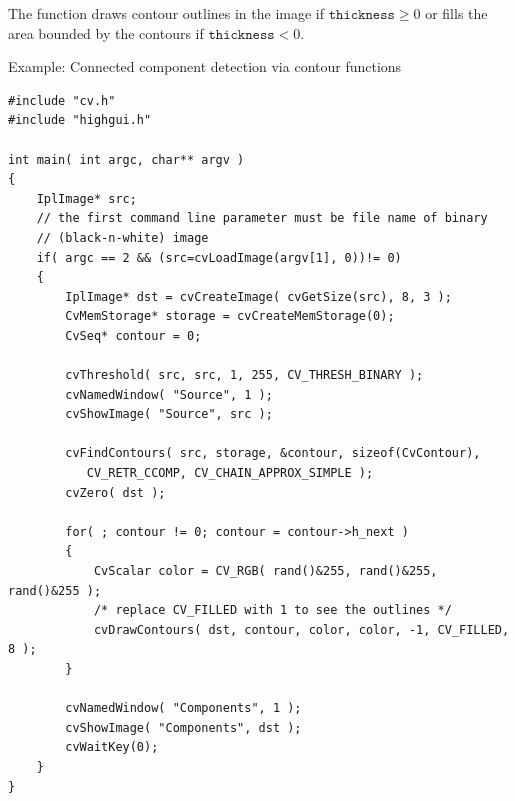 \begin{description}
\end{description}

The function draws contour outlines in the image if $\texttt{thickness} \ge 0$ or fills the area bounded by the contours if $ \texttt{thickness}<0$.

\ifC
Example: Connected component detection via contour functions

\begin{lstlisting}
#include "cv.h"
#include "highgui.h"

int main( int argc, char** argv )
{
    IplImage* src;
    // the first command line parameter must be file name of binary 
    // (black-n-white) image
    if( argc == 2 && (src=cvLoadImage(argv[1], 0))!= 0)
    {
        IplImage* dst = cvCreateImage( cvGetSize(src), 8, 3 );
        CvMemStorage* storage = cvCreateMemStorage(0);
        CvSeq* contour = 0;

        cvThreshold( src, src, 1, 255, CV_THRESH_BINARY );
        cvNamedWindow( "Source", 1 );
        cvShowImage( "Source", src );

        cvFindContours( src, storage, &contour, sizeof(CvContour), 
           CV_RETR_CCOMP, CV_CHAIN_APPROX_SIMPLE );
        cvZero( dst );

        for( ; contour != 0; contour = contour->h_next )
        {
            CvScalar color = CV_RGB( rand()&255, rand()&255, rand()&255 );
            /* replace CV_FILLED with 1 to see the outlines */
            cvDrawContours( dst, contour, color, color, -1, CV_FILLED, 8 );
        }

        cvNamedWindow( "Components", 1 );
        cvShowImage( "Components", dst );
        cvWaitKey(0);
    }
}
\end{lstlisting}
\fi

